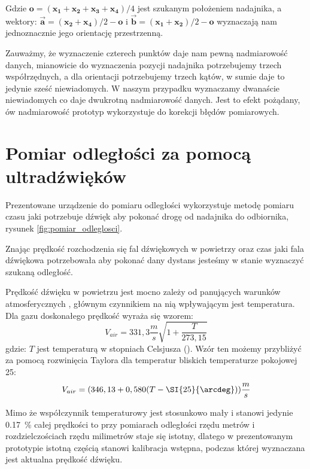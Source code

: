 Gdzie $\boldsymbol{o} = (\boldsymbol{x_1} + \boldsymbol{x_2} + \boldsymbol{x_3} + \boldsymbol{x_4})/4$ jest szukanym położeniem
nadajnika, a wektory: $\boldsymbol{\overrightarrow{a}} = (\boldsymbol{x_2} + \boldsymbol{x_4})/2 - \boldsymbol{o}$ i 
$\boldsymbol{\overrightarrow{b}} = (\boldsymbol{x_1} + \boldsymbol{x_2})/2 - \boldsymbol{o}$ wyznaczają nam jednoznacznie
jego orientację przestrzenną.

Zauważmy, że wyznaczenie czterech punktów daje nam pewną nadmiarowość
danych, mianowicie do wyznaczenia pozycji nadajnika potrzebujemy trzech współrzędnych,
a dla orientacji potrzebujemy trzech kątów, w sumie daje to jedynie sześć niewiadomych.
W naszym przypadku wyznaczamy dwanaście niewiadomych co daje dwukrotną nadmiarowość danych.
Jest to efekt pożądany, ów nadmiarowość prototyp wykorzystuje do korekcji błędów pomiarowych.


\section{Pomiar odległości za pomocą ultradźwięków}

Prezentowane urządzenie do pomiaru odległości wykorzystuje metodę pomiaru czasu jaki 
potrzebuje dźwięk aby pokonać drogę od nadajnika do odbiornika,
rysunek \ref{fig:pomiar_odleglosci}.

Znając prędkość rozchodzenia się fal dźwiękowych w powietrzy oraz czas jaki fala dźwiękowa potrzebowała
aby pokonać dany dystans jesteśmy w stanie wyznaczyć szukaną odległość.

Prędkość dźwięku w powietrzu jest mocno zależy od panujących warunków atmosferycznych \cite{bib:soundSpeed},  
głównym czynnikiem na nią wpływającym jest temperatura.
Dla gazu doskonałego prędkość wyraża się wzorem:
\[
V_{air} = 331,3  \frac{m}{s}  \sqrt{1+\frac{T}{273,15}}
\]
gdzie: $T$ jest temperaturą w stopniach Celsjusza (\SI{}{\degC}).
Wzór ten możemy przybliżyć za pomocą rozwinięcia Taylora dla temperatur bliskich temperaturze pokojowej \SI{25}{\degC}:
\[
 V_{air} = (346,13  +  0,580(T - \SI{25}{\arcdeg})) \frac{m}{s}
\]

Mimo że współczynnik temperaturowy jest stosunkowo mały i stanowi jedynie \SI{0,17}{\%} całej prędkości
to przy pomiarach odległości rzędu metrów i rozdzielczościach rzędu milimetrów staje się istotny, 
dlatego w prezentowanym prototypie istotną częścią stanowi kalibracja wstępna, podczas której
wyznaczana jest aktualna prędkość dźwięku.





